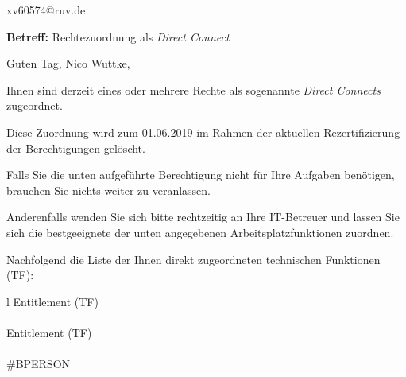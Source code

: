\documentclass[a4paper,landscape,12pt]{letter}
\begin{document}
\begin{letter}{xv60574@ruv.de\hfill \break}
\begin{normalsize}
	\opening{\textbf{Betreff:} Rechtezuordnung als \emph{Direct Connect}}
	\begin{normalsize} \hfill
	\end{normalsize}

	\begin{normalsize}
		Guten Tag, 
	Nico Wuttke, \hfill \break
	\end{normalsize}
	\end{normalsize}
	
\begin{normalsize}
	Ihnen sind derzeit eines oder mehrere Rechte als sogenannte \emph{Direct Connects} zugeordnet.
	
	Diese Zuordnung wird zum 01.06.2019 im Rahmen der aktuellen Rezertifizierung der Berechtigungen gelöscht.
	
	Falls Sie die unten aufgeführte Berechtigung nicht für Ihre Aufgaben benötigen, 
	brauchen Sie nichts weiter zu veranlassen.
	
	Anderenfalls wenden Sie sich bitte rechtzeitig an Ihre IT-Betreuer 
	und lassen Sie sich die bestgeeignete der unten angegebenen Arbeitsplatzfunktionen zuordnen.
	\end{normalsize}
	
\begin{normalsize}
	Nachfolgend die Liste der Ihnen direkt zugeordneten technischen Funktionen (TF):

	\begin{longtable}{l}
		Entitlement (TF) \\ \hline
		\endfirsthead
		\\\hline
		Entitlement (TF) \\ \hline
		\endhead %
		\multicolumn{1}{r@{}}{Fortsetzung \ldots}\\
		\endfoot
		\hline
		\endlastfoot
	\#BPERSON\\
	\end{longtable}
	\end{normalsize}
	

\end{letter}
\end{document}
